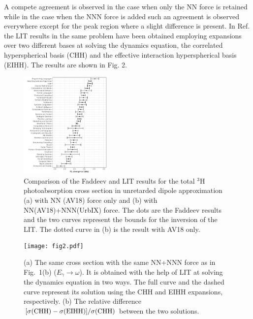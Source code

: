 \documentclass[12pt,ams,preprint,a4paper]{revtex4}
\begin{document}
A compete agreement is observed in the case when only the NN force is retained 
while in the case when the NNN force is added such an agreement 
is observed everywhere except for the peak region where a slight difference is present. 
In Ref. \cite{EIHH} the LIT results in the same problem have been obtained employing expansions over
two different bases at solving the dynamics equation, the correlated hyperspherical 
basis (CHH) and the effective interaction 
hyperspherical basis (EIHH). The results are shown in Fig. 2.
 
\begin{figure}
\centerline{\includegraphics[width=0.4\textwidth]{fig1.pdf}}
\caption{Comparison of the Faddeev and LIT results for the total 
$^3$H photoabsorption cross section in unretarded dipole approximation
(a) with NN (AV18) force  only and (b) with NN(AV18)+NNN(UrbIX) force. The dots are the Faddeev results
and the two curves represent the bounds for the inversion of the LIT.
The dotted curve in (b) is the result with AV18 only.}
\label{fig1}      
\end{figure}


\begin{figure}
\centerline{\texttt{[image: fig2.pdf]}}
\caption{(a) The same cross section with the same NN+NNN force as 
in Fig.~1(b) ($E_\gamma\rightarrow\omega$). 
It is obtained with the help of LIT
at solving the dynamics equation in two ways. The full curve and the dashed
curve represent its solution using the CHH and EIHH expansions, respectively. (b) The 
relative difference \mbox{$[\sigma({\rm CHH})-\sigma({\rm EIHH})]/\sigma({\rm CHH})$} 
between the two solutions.}
\label{fig2}      
\end{figure}
\end{document}
